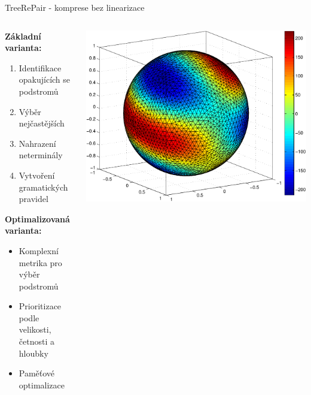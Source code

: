 \documentclass[lualatex,hyperref={pdfencoding=auto}]{beamer}
\begin{document}
\begin{frame}{TreeRePair - komprese bez linearizace}
  \begin{columns}
    \begin{column}{0.55\textwidth}
      \textbf{Základní varianta:}
      \begin{enumerate}
        \item Identifikace opakujících se podstromů
        \item Výběr nejčastějších
        \item Nahrazení neterminály
        \item Vytvoření gramatických pravidel
      \end{enumerate}
      \vspace{2mm}
      \textbf{Optimalizovaná varianta:}
      \begin{itemize}
        \item Komplexní metrika pro výběr podstromů
        \item Prioritizace podle velikosti, četnosti a hloubky
        \item Paměťové optimalizace
      \end{itemize}
    \end{column}
    \begin{column}{0.45\textwidth}
      \includegraphics[width=\textwidth]{fig/sphere_mix_real.pdf}
    \end{column}
  \end{columns}
\end{frame}
\end{document}
